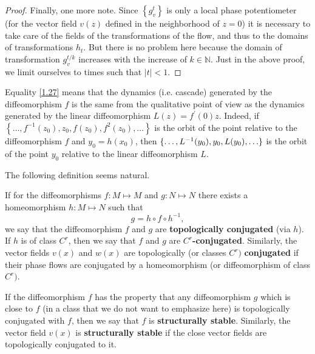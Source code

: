 \begin{theorem}
\begin{proof}
		Finally, one more note.	Since $ \left \{g_ {v} ^ {t} \right \} $ is only a local phase potentiometer (for the vector field $ v (z)$ defined in the neighborhood of $ z = 0$) it is necessary to take care of the fields of the transformations of the flow, and thus to the domains of transformations $ h_ {t} $. But there is no problem here because the domain of transformation $ g_ {v} ^ {t / k} $ increases with the increase of $ k \in \mathbb {N} $. Just in the above proof, we limit ourselves to times such that $ \left \vert t \right \vert <1 $.
	\end{proof}
\end{theorem}

Equality \eqref{1.27} means that the dynamics (i.e. cascade) generated by the diffeomorphism $ f $  is the same from the qualitative point of view as the dynamics generated by the linear diffeomorphism $L (z) = f ^ {\prime}(0)z $. Indeed, if $\left\{ \ldots, f^{-1}(z_{0}), z_{0}, f(z_{0}), f^{2}(z_{0}), \ldots \right\} $ is the orbit of the point relative to the diffeomorphism $ f $ and $y_{0}=h(x_{0})$, then $\{\ldots, L^{-1}(y_{0}), y_{0},\linebreak L(y_{0}), \ldots \}$ is the orbit of the point $y_{0}$ relative to the linear diffeomorphism $ L $.

The following definition seems natural.

\begin{definition}\label{def:1.24}
	If for the diffeomorphisms $ f: M \longmapsto M $ and $ g: N \longmapsto N $  there exists a homeomorphism $ h: M \longmapsto N $  such that
	$$
	g=h\circ f\circ h^{-1},
	$$
	we say that the diffeomorphism $ f $ and $ g $ are \textbf {topologically conjugated} (via $ h $). If $ h $ is of class $ C ^ {r} $, then we say that $f$ and $g$ are \textbf{$ C ^ {r} $-conjugated}. Similarly, the vector fields $ v (x) $ and $ w (x) $ are topologically (or classes $ C ^ {r}) $  \textbf{conjugated} if their phase flows are conjugated by a homeomorphism (or diffeomorphism of class $ C ^ {r}) $.
	
	If the diffeomorphism $ f $ has the property that any diffeomorphism $ g $ which is close to $ f $ (in a class that we do not want to emphasize here) is topologically conjugated with $ f $, then we say that $ f $ is \textbf {structurally stable}. Similarly, the vector field $ v (x) $ is \textbf {structurally stable} if the close vector fields are topologically conjugated to it.
\end{definition}


